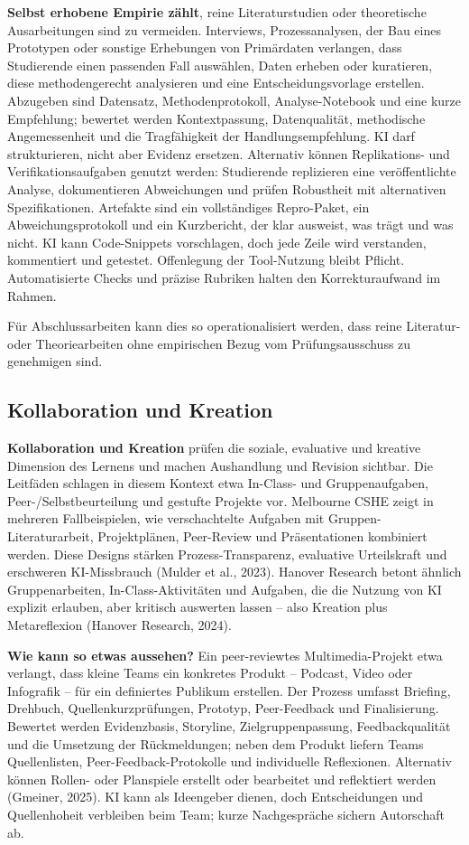\documentclass[
  ngerman,
  letterpaper,
  DIV=11]{scrreprt}
\begin{document}
\textbf{Selbst erhobene Empirie zählt}, reine Literaturstudien oder
theoretische Ausarbeitungen sind zu vermeiden. Interviews,
Prozessanalysen, der Bau eines Prototypen oder sonstige Erhebungen von
Primärdaten verlangen, dass Studierende einen passenden Fall auswählen,
Daten erheben oder kuratieren, diese methodengerecht analysieren und
eine Entscheidungsvorlage erstellen. Abzugeben sind Datensatz,
Methodenprotokoll, Analyse-Notebook und eine kurze Empfehlung; bewertet
werden Kontextpassung, Datenqualität, methodische Angemessenheit und die
Tragfähigkeit der Handlungsempfehlung. KI darf strukturieren, nicht aber
Evidenz ersetzen. Alternativ können Replikations- und
Verifikationsaufgaben genutzt werden: Studierende replizieren eine
veröffentlichte Analyse, dokumentieren Abweichungen und prüfen
Robustheit mit alternativen Spezifikationen. Artefakte sind ein
vollständiges Repro-Paket, ein Abweichungsprotokoll und ein Kurzbericht,
der klar ausweist, was trägt und was nicht. KI kann Code-Snippets
vorschlagen, doch jede Zeile wird verstanden, kommentiert und getestet.
Offenlegung der Tool-Nutzung bleibt Pflicht. Automatisierte Checks und
präzise Rubriken halten den Korrekturaufwand im Rahmen.

Für Abschlussarbeiten kann dies so operationalisiert werden, dass reine
Literatur- oder Theoriearbeiten ohne empirischen Bezug vom
Prüfungsausschuss zu genehmigen sind.

\subsection{Kollaboration und
Kreation}\label{kollaboration-und-kreation}

\textbf{Kollaboration und Kreation} prüfen die soziale, evaluative und
kreative Dimension des Lernens und machen Aushandlung und Revision
sichtbar. Die Leitfäden schlagen in diesem Kontext etwa In-Class- und
Gruppenaufgaben, Peer-/Selbstbeurteilung und gestufte Projekte vor.
Melbourne CSHE zeigt in mehreren Fallbeispielen, wie verschachtelte
Aufgaben mit Gruppen-Literaturarbeit, Projektplänen, Peer-Review und
Präsentationen kombiniert werden. Diese Designs stärken
Prozess-Transparenz, evaluative Urteilskraft und erschweren
KI-Missbrauch (Mulder et al., 2023). Hanover Research betont ähnlich
Gruppenarbeiten, In-Class-Aktivitäten und Aufgaben, die die Nutzung von
KI explizit erlauben, aber kritisch auswerten lassen -- also Kreation
plus Metareflexion (Hanover Research, 2024).

\textbf{Wie kann so etwas aussehen?} Ein peer-reviewtes
Multimedia-Projekt etwa verlangt, dass kleine Teams ein konkretes
Produkt -- Podcast, Video oder Infografik -- für ein definiertes
Publikum erstellen. Der Prozess umfasst Briefing, Drehbuch,
Quellenkurzprüfungen, Prototyp, Peer-Feedback und Finalisierung.
Bewertet werden Evidenzbasis, Storyline, Zielgruppenpassung,
Feedbackqualität und die Umsetzung der Rückmeldungen; neben dem Produkt
liefern Teams Quellenlisten, Peer-Feedback-Protokolle und individuelle
Reflexionen. Alternativ können Rollen- oder Planspiele erstellt oder
bearbeitet und reflektiert werden (Gmeiner, 2025). KI kann als
Ideengeber dienen, doch Entscheidungen und Quellenhoheit verbleiben beim
Team; kurze Nachgespräche sichern Autorschaft ab.
\end{document}
